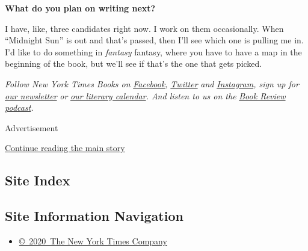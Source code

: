\textbf{What do you plan on writing next?}

I have, like, three candidates right now. I work on them occasionally.
When ``Midnight Sun'' is out and that's passed, then I'll see which one
is pulling me in. I'd like to do something in \emph{fantasy} fantasy,
where you have to have a map in the beginning of the book, but we'll see
if that's the one that gets picked.

\emph{Follow New York Times Books on}
\href{https://www.facebook.com/nytbooks/}{\emph{Facebook}}\emph{,}
\href{https://twitter.com/nytimesbooks}{\emph{Twitter}} \emph{and}
\href{https://www.instagram.com/nytbooks/}{\emph{Instagram}}\emph{, sign
up for}
\href{https://www.nytimes.com/newsletters/books-review}{\emph{our
newsletter}} \emph{or}
\href{https://www.nytimes.com/interactive/2017/books/books-calendar.html}{\emph{our
literary calendar}}\emph{. And listen to us on the}
\href{https://www.nytimes.com/column/book-review-podcast}{\emph{Book
Review podcast}}\emph{.}

Advertisement

\protect\hyperlink{after-bottom}{Continue reading the main story}

\hypertarget{site-index}{%
\subsection{Site Index}\label{site-index}}

\hypertarget{site-information-navigation}{%
\subsection{Site Information
Navigation}\label{site-information-navigation}}

\begin{itemize}
\tightlist
\item
  \href{https://help.nytimes.com/hc/en-us/articles/115014792127-Copyright-notice}{©~2020~The
  New York Times Company}
\end{itemize}

